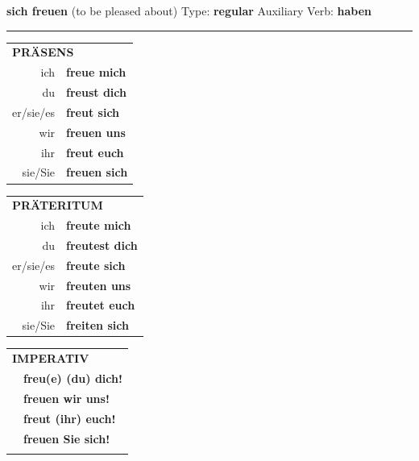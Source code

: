 \documentclass[10pt,a4paper]{revtex4-2}
\begin{document}
\begin{verbbox}
    {\Large \bf sich freuen} (to be pleased about) \hfill Type: \textbf{regular} \hfill Auxiliary Verb: \textbf{haben} 
    
     \vspace{5pt}

    \hrule
    
    \vspace{5pt}

  \begin{tabular}{rl}
     \multicolumn{2}{l}{\textbf{PRÄSENS} }\\
    ich & \textbf{freue mich}\\
    du & \textbf{freust dich}\\
    er/sie/es & \textbf{freut sich}\\
    wir & \textbf{freuen uns}\\
    ihr & \textbf{freut euch}\\
    sie/Sie & \textbf{freuen sich}\\
  \end{tabular}
  \hfill
     \begin{tabular}{rl}
    \multicolumn{2}{l}{\textbf{PRÄTERITUM} }\\
    ich & \textbf{freute mich}\\
    du & \textbf{freutest dich}\\
    er/sie/es & \textbf{freute sich}\\
    wir & \textbf{freuten uns}\\
    ihr & \textbf{freutet euch}\\
    sie/Sie & \textbf{freiten sich}\\
  \end{tabular}
  \hfill
  \begin{tabular}{rl}
     \multicolumn{2}{l}{\textbf{IMPERATIV} }\\
   & \textbf{freu(e) (du) dich!}\\
   & \textbf{freuen wir uns!}\\
   & \textbf{freut (ihr) euch!}\\
   & \textbf{freuen Sie sich!}\\
   & \vspace{10pt}
  \end{tabular}

    \vspace{10pt}


\end{verbbox}
\end{document}
